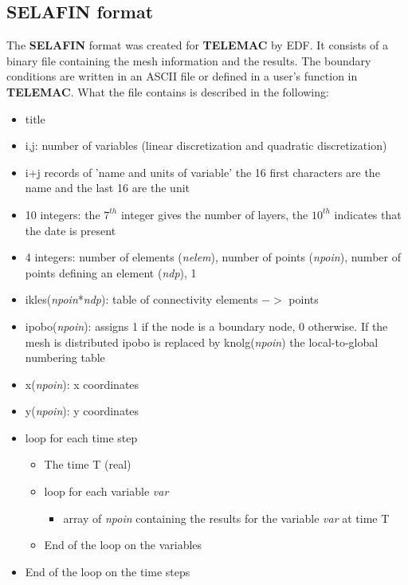 \documentclass[a4paper,10pt]{article}
\newcommand{\tel}{\textbf{TELEMAC}\xspace}
\newcommand{\slf}{\textbf{SELAFIN}\xspace}
\begin{document}
\subsection{\slf format}

The \slf format was created for \tel by EDF. It consists of a binary file containing the mesh information and the results.
The boundary conditions are written in an ASCII file or defined in a user's function in \tel.
What the file contains is described in the following:

\begin{itemize}
\setlength{\itemsep}{1pt}
\setlength{\parskip}{0pt}
\setlength{\parsep}{0pt}
\item title
\item i,j: number of variables (linear discretization and quadratic discretization)
\item i+j records of 'name and units of variable' the 16 first characters are the name and the last 16 are the unit
\item 10 integers: the $7^{th}$ integer gives the number of layers, the $10^{th}$ indicates that the date is present
\item 4 integers: number of elements (\textit{nelem}), number of points (\textit{npoin}), 
      number of points defining an element (\textit{ndp}), 1
\item ikles(\textit{npoin}*\textit{ndp}): table of connectivity elements $->$ points
\item ipobo(\textit{npoin}): assigns 1 if the node is a boundary node, 0 otherwise. 
If the mesh is distributed ipobo is replaced by  knolg(\textit{npoin}) the local-to-global numbering table
\item x(\textit{npoin}): x coordinates
\item y(\textit{npoin}): y coordinates
\item loop for each time step
\begin{itemize}
\setlength{\itemsep}{1pt}
\setlength{\parskip}{0pt}
\setlength{\parsep}{0pt}
\item The time T (real)
\item loop for each variable \textit{var}
\begin{itemize}
\setlength{\itemsep}{1pt}
\setlength{\parskip}{0pt}
\setlength{\parsep}{0pt}
\item array of \textit{npoin} containing the results for the variable \textit{var} at time T
\end{itemize}
\item End of the loop on the variables
\end{itemize}
\item End of the loop on the time steps
\end{itemize}
\end{document}
